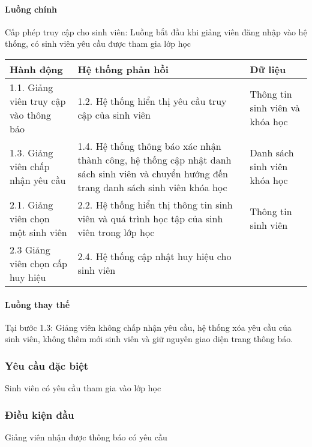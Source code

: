 \documentclass[./../main_file.tex]{subfiles}
\begin{document}
\paragraph{Luồng chính}
Cấp phép truy cập cho sinh viên: Luồng bắt đầu khi giảng viên đăng nhập vào hệ thống, có sinh viên yêu cầu được tham gia lớp học
\begin{table}[H]
				\begin{tabular}{|p{.33\textwidth}|p{}|p{}|}
		\hline
		\textbf{Hành động}                     & \textbf{Hệ thống phản hồi}                                                                  & \textbf{Dữ liệu}                \\ \hline
		1.1. Giảng viên truy cập vào thông báo & 1.2. Hệ thống hiển thị yêu cầu truy cập của sinh viên                                       & Thông tin sinh viên và khóa học \\ \hline
		1.3. Giảng viên chấp nhận yêu cầu &
		1.4. Hệ thống thông báo xác nhận thành công, hệ thống cập nhật danh sách sinh viên và chuyển hướng đến trang danh sách sinh viên khóa học &
		Danh sách sinh viên khóa học \\ \hline
		2.1. Giảng viên chọn một sinh viên     & 2.2. Hệ thống hiển thị thông tin sinh viên và quá trình học tập của sinh viên trong lớp học & Thông tin sinh viên             \\ \hline
		2.3 Giảng viên chọn cấp huy hiệu       & 2.4. Hệ thống cập nhật huy hiệu cho sinh viên                                               &                                 \\ \hline
	\end{tabular}
\end{table}
\paragraph{Luồng thay thế}
Tại bước 1.3: Giảng viên không chấp nhận yêu cầu, hệ thống xóa yêu cầu của sinh viên, không thêm mới sinh viên và giữ nguyên giao diện trang thông báo.
\subsubsection{Yêu cầu đặc biệt}
Sinh viên có yêu cầu tham gia vào lớp học

\subsubsection{Điều kiện đầu}
Giảng viên nhận được thông báo có yêu cầu 
\end{document}
